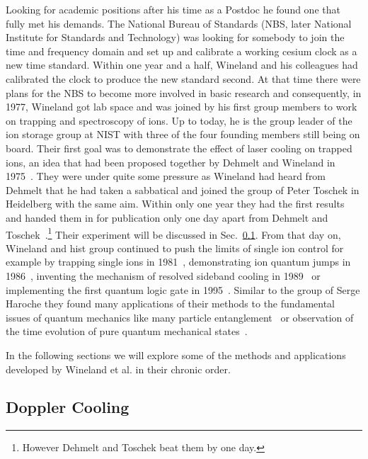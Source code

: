 Looking for academic positions after his time as a Postdoc he found one that
fully met his demands. The National Bureau of Standards (NBS, later National
Institute for Standards and Technology) was looking for somebody to join the
time and frequency domain and set up and calibrate a working cesium clock as a new time
standard. Within one year and a half, Wineland and his colleagues had calibrated
the clock to produce the new standard second. At that time there were plans for
the NBS to become more involved in basic research and consequently, in 1977,
Wineland got lab space and was joined by his first group members to work on
trapping and spectroscopy of ions. Up to today, he is the group leader of the
ion storage group at NIST with three of the four founding members still being on
board. Their first goal was to demonstrate the
effect of laser cooling on trapped ions, an idea that had been proposed together
by Dehmelt and Wineland in 1975~\cite{wineland1975bullamphys}. They were under
quite some pressure as Wineland had heard from Dehmelt that he had taken a
sabbatical and joined the group of Peter Toschek in Heidelberg with the same
aim. Within only one year they had the first results and handed them in for
publication only one day apart from Dehmelt and
Toschek~\cite{wineland1978radiation, neuhauser1978optical}.\footnote{However
Dehmelt and Toschek beat them by one day.} Their experiment will
be discussed in Sec.~\ref{sec:DopplerCooling}. From that day on, Wineland and
hist group continued to push the limits of single ion control for example by trapping
single ions in 1981~\cite{wineland1981spectroscopy}, demonstrating ion quantum
jumps in 1986~\cite{bergquist1986observation}, inventing the mechanism of resolved
sideband cooling in 1989~\cite{diedrich1989laser} or implementing the first quantum
logic gate in 1995~\cite{monroe1995demonstration}. Similar to the group of Serge
Haroche they found many applications of their methods to the fundamental
issues of quantum mechanics like many particle
entanglement~\cite{sackett2000experimental} or observation of the time evolution of
pure quantum mechanical states~\cite{leibfried2003quantum}.

In the following sections we will explore some of the methods and applications
developed by Wineland et al. in their chronic order. 


\subsection{Doppler Cooling}
\label{sec:DopplerCooling}

